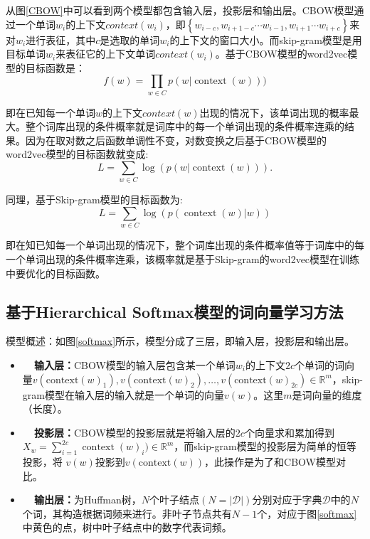从图\ref{CBOW}中可以看到两个模型都包含输入层，投影层和输出层。CBOW模型通过一个单词$w_i$的上下文$context(w_i)$，即$\left\{ w _ { i - c } , w _ { i + 1 - c } \cdots w _ { i - 1 } , w _ { i + 1 } \cdots w _ { i + c }\right\}$来对$w_i$进行表征，其中$c$是选取的单词$w_i$的上下文的窗口大小。而skip-gram模型是用目标单词$w_i$来表征它的上下文单词$context(w_i)$。基于CBOW模型的word2vec模型的目标函数是：
\begin{equation}
f ( w ) = \prod _ { w \in C } p ( w | \operatorname { context } ( w ) ) )
\end{equation}

即在已知每一个单词$w$的上下文$context(w)$出现的情况下，该单词出现的概率最大。整个词库出现的条件概率就是词库中的每一个单词出现的条件概率连乘的结果。因为在取对数之后函数单调性不变，对数变换之后基于CBOW模型的word2vec模型的目标函数就变成:
\begin{equation}
L = \sum _ { w \in C } \log \left( p \left( w | \operatorname { context } \left( w \right) \right) \right). 
\end{equation}

同理，基于Skip-gram模型的目标函数为:
\begin{equation}
L = \sum _ { w \in C } \log \left( p \left( \operatorname { context } \left( w \right) | w \right) \right)
\end{equation}

即在知已知每一个单词出现的情况下，整个词库出现的条件概率值等于词库中的每一个单词出现的条件概率连乘，该概率就是基于Skip-gram的word2vec模型在训练中要优化的目标函数。

\subsection{基于Hierarchical Softmax模型的词向量学习方法}

模型概述：如图\ref{softmax}所示，模型分成了三层，即输入层，投影层和输出层。
\begin{itemize}
    \item \textbf{~~输入层：}CBOW模型的输入层包含某一个单词$w_i$的上下文$2c$个单词的词向量$v \left( \text {context} ( w ) _ { 1 } \right) , v \left( \text {context} ( w ) _ { 2 } \right) , \ldots , v \left( \text {context} ( w ) _ { 2 c } \right) \in \mathbb { R } ^ { m }$，skip-gram模型在输入层的输入就是一个单词的向量$v(w)$。这里$m$是词向量的维度（长度）。
    \item \textbf{~~投影层：}CBOW模型的投影层就是将输入层的$2c$个向量求和累加得到$X _ { w } = \sum _ { i = 1 } ^ { 2 c } \operatorname { context } ( w ) _ { i } ) \in \mathbb { R } ^ { m }$，而skip-gram模型的投影层为简单的恒等投影，将 $v(w)$投影到$v(\text{context}(w))$，此操作是为了和CBOW模型对比。
    \item \textbf{~~输出层：}为Huffman树，$N$个叶子结点$(N=|\mathcal{D}|)$分别对应于字典$\mathcal{D}$中的$N$个词，其构造根据词频来进行。非叶子节点共有$N-1$个，对应于图\ref{softmax}中黄色的点，树中叶子结点中的数字代表词频。
\end{itemize}

